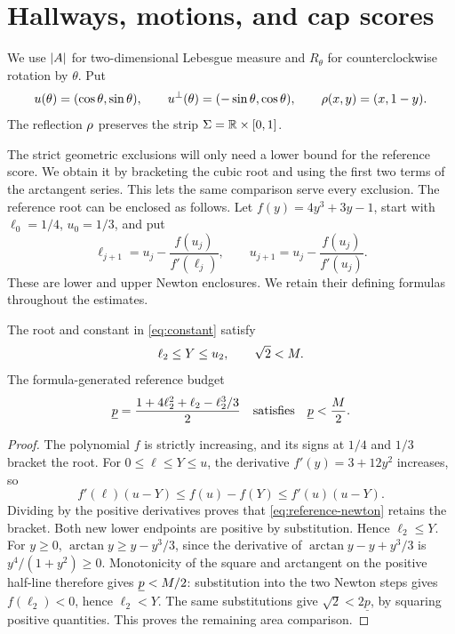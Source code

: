 \section{Hallways, motions, and cap scores}\label{sec:setting}\label{sec:definitions}

We use $\lvert A\rvert$ for two-dimensional Lebesgue measure and
$R_\theta$ for counterclockwise rotation by $\theta$. Put
\[
 u(\theta)=(\cos\theta,\sin\theta),\qquad
 u^\perp(\theta)=(-\sin\theta,\cos\theta),\qquad
 \rho(x,y)=(x,1-y).
\]
The reflection $\rho$ preserves the strip $\Sigma=\mathbb{R}\times[0,1]$.

The strict geometric exclusions will only need a lower bound for the
reference score. We obtain it by bracketing the cubic root and using the
first two terms of the arctangent series. This lets the same comparison
serve every exclusion. The reference root can be enclosed as follows.
Let $f(y)=4y^3+3y-1$, start with $\ell_0=1/4$, $u_0=1/3$, and put
\begin{equation}\label{eq:reference-newton}
 \ell_{j+1}=u_j-\frac{f(u_j)}{f'(\ell_j)},\qquad
 u_{j+1}=u_j-\frac{f(u_j)}{f'(u_j)}.
\end{equation}
These are lower and upper Newton enclosures. We retain their defining
formulas throughout the estimates.

\begin{lemma}\label{lem:constant-bounds}
The root and constant in \cref{eq:constant} satisfy
\[
 \ell_2\le Y\le u_2,\qquad \sqrt2<M.
\]
The formula-generated reference budget
\begin{equation}\label{eq:reference-half-area-lower}
 \underline p=\frac{1+4\ell_2^2+\ell_2-\ell_2^3/3}{2}
 \quad\text{satisfies}\quad
 \underline p<\frac{M}2.
\end{equation}
\end{lemma}
\begin{proof}
The polynomial $f$ is strictly increasing, and its signs at $1/4$ and
$1/3$ bracket the root.
For $0\le\ell\le Y\le u$, the derivative $f'(y)=3+12y^2$ increases, so
\[
 f'(\ell)(u-Y)\le f(u)-f(Y)\le f'(u)(u-Y).
\]
Dividing by the positive derivatives proves that
\cref{eq:reference-newton} retains the bracket. Both new lower endpoints
are positive by substitution. Hence $\ell_2\le Y$.
For $y\ge0$, $\arctan y\ge y-y^3/3$, since the derivative of
$\arctan y-y+y^3/3$ is $y^4/(1+y^2)\ge0$.
Monotonicity of the square and arctangent on the positive half-line
therefore gives $\underline p<M/2$: substitution into the two
Newton steps gives $f(\ell_2)<0$, hence $\ell_2<Y$.
The same substitutions give $\sqrt2<2\underline p$, by squaring
positive quantities. This proves the remaining area comparison.
\end{proof}

